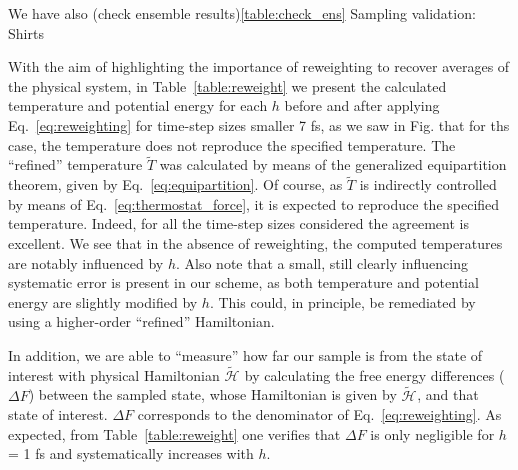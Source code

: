 \documentclass[
journal=jctcce,
layout=twocolumn
]{achemso}
\newcommand{\Ham}[1]{{\mathcal H}_\text{#1}}    %
\newcommand{\timestep}{h}
\newcommand{\refined}[1]{\widetilde{#1}}
\begin{document}
We have also (check ensemble results)\ref{table:check_ens} Sampling validation: Shirts \cite{Shirts_2013}

With the aim of highlighting the importance of reweighting to recover averages of the physical system, in Table~\ref{table:reweight} we present the calculated temperature and potential energy for each $\timestep$ before and after applying Eq.~\ref{eq:reweighting} for time-step sizes smaller 7 fs, as we saw in Fig. that for ths case, the temperature does not reproduce the specified temperature.
The ``refined'' temperature $\refined{T}$ was calculated by means of the generalized equipartition theorem, given by Eq.~\ref{eq:equipartition}.
Of course, as $\refined{T}$ is indirectly controlled by means of Eq.~\ref{eq:thermostat_force}, it is expected to reproduce the specified temperature.
Indeed, for all the time-step sizes considered the agreement is excellent.
We see that in the absence of reweighting, the computed temperatures are notably influenced by $h$.
Also note that a small, still clearly influencing systematic error is present in our scheme, as both temperature and potential energy are slightly modified by $h$. This could, in principle, be remediated by using a higher-order ``refined'' Hamiltonian.

In addition, we are able to ``measure'' how far our sample is from the state of interest with physical Hamiltonian $\refined{\Ham{}}$ by calculating the free energy differences ($\Delta F$) between the sampled state, whose Hamiltonian is given by $\refined{\Ham{}}$, and that state of interest.
$\Delta F$ corresponds to the denominator of Eq.~\ref{eq:reweighting}.
As expected, from Table~\ref{table:reweight} one verifies that $\Delta F$ is only negligible for $h$ = 1 fs and systematically increases with $h$.
\end{document}
